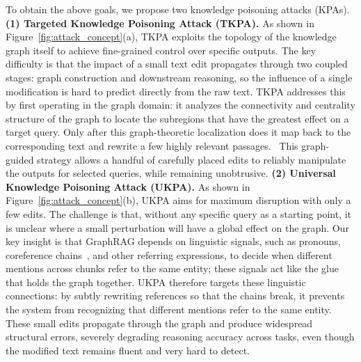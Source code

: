 \documentclass[letterpaper]{article} %
\begin{document}
To obtain the above goals, we propose two knowledge poisoning attacks (KPAs).
\textbf{(1) Targeted Knowledge Poisoning Attack (TKPA).}
As shown in Figure~\ref{fig:attack_concept}(a), TKPA exploits the topology of the knowledge graph itself to achieve fine-grained control over specific outputs.  
The key difficulty is that the impact of a small text edit propagates through two coupled stages: graph construction and downstream reasoning, so the influence of a single modification is hard to predict directly from the raw text.  
TKPA addresses this by first operating in the graph domain: it analyzes the connectivity and centrality structure of the graph to locate the subregions that have the greatest effect on a target query. 
Only after this graph-theoretic localization does it map back to the corresponding text and rewrite a few highly relevant passages.~\cite{DBLP:journals/pr/PengZZ13,gross2018graph}  
This graph-guided strategy allows a handful of carefully placed edits to reliably manipulate the outputs for selected queries, while remaining unobtrusive.
\textbf{(2) Universal Knowledge Poisoning Attack (UKPA).}
As shown in Figure~\ref{fig:attack_concept}(b), UKPA aims for maximum disruption with only a few edits.  
The challenge is that, without any specific query as a starting point, it is unclear where a small perturbation will have a global effect on the graph.  
Our key insight is that GraphRAG depends on linguistic signals, such as pronouns, coreference chains~\cite{peng2019text}, and other referring expressions, to decide when different mentions across chunks refer to the same entity; 
these signals act like the glue that holds the graph together.  
UKPA therefore targets these linguistic connections: by subtly rewriting references so that the chains break, 
it prevents the system from recognizing that different mentions refer to the same entity.  
These small edits propagate through the graph and produce widespread structural errors, severely degrading reasoning accuracy across tasks, even though the modified text remains fluent and very hard to detect.
\end{document}

